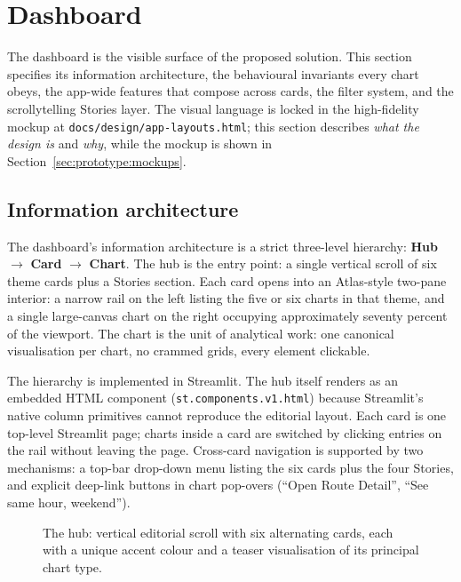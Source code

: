 \section{Dashboard}
\label{sec:proposed:dashboard}

The dashboard is the visible surface of the proposed solution.
This section specifies its information architecture, the
behavioural invariants every chart obeys, the app-wide features
that compose across cards, the filter system, and the
scrollytelling Stories layer. The visual language is locked in
the high-fidelity mockup at
\texttt{docs/design/app-layouts.html}; this section describes
\emph{what the design is} and \emph{why}, while the mockup is
shown in Section~\ref{sec:prototype:mockups}.

\subsection{Information architecture}
\label{sec:proposed:ia}

The dashboard's information architecture is a strict three-level
hierarchy:
\textbf{Hub} $\rightarrow$ \textbf{Card} $\rightarrow$
\textbf{Chart}. The hub is the entry point: a single vertical
scroll of six theme cards plus a Stories section. Each card
opens into an Atlas-style two-pane interior: a narrow rail on
the left listing the five or six charts in that theme, and a
single large-canvas chart on the right occupying approximately
seventy percent of the viewport. The chart is the unit of
analytical work: one canonical visualisation per chart, no
crammed grids, every element clickable.

The hierarchy is implemented in Streamlit. The hub itself
renders as an embedded HTML component
(\texttt{st.components.v1.html}) because Streamlit's native
column primitives cannot reproduce the editorial layout. Each
card is one top-level Streamlit page; charts inside a card are
switched by clicking entries on the rail without leaving the
page. Cross-card navigation is supported by two mechanisms: a
top-bar drop-down menu listing the six cards plus the four
Stories, and explicit deep-link buttons in chart pop-overs
(``Open Route Detail'', ``See same hour, weekend'').

\begin{figure}[H]
\centering
{}
\caption{The hub: vertical editorial scroll with six alternating
cards, each with a unique accent colour and a teaser
visualisation of its principal chart type.}
\label{fig:proposed:hub}
\end{figure}

